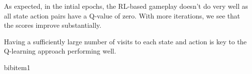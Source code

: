\documentclass[11pt, oneside]{article}   	%
\begin{document}
\newline
As expected, in the intial epochs, the RL-based gameplay doesn't do very well as all state action pairs have a Q-value of zero. With more iterations, we see that the scores improve substantially.

\newline
Having a sufficiently large number of visits to each state and action is key to the Q-learning approach performing well.

\begin{thebibliography}{1}

 bibitem1 
 
  \end{thebibliography}
\end{document}
